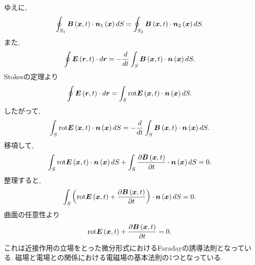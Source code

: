 \documentclass[10pt,a4paper]{jsarticle}
\begin{document}
ゆえに, 
\begin{align*}
    \oint_{S_1} \bm{B} \left( \bm{x}, t \right) \cdot \bm{n}_1 \left( \bm{x} \right) dS = \oint_{S_2} \bm{B} \left( \bm{x}, t \right) \cdot \bm{n}_2 \left( \bm{x} \right) dS. 
\end{align*}
また, 
\begin{align*}
    \oint \bm{E} \left( \bm{r}, t \right) \cdot d \bm{r} = - \frac{d}{dt} \int_S \bm{B} \left( \bm{x}, t \right) \cdot \bm{n} \left( \bm{x} \right) dS.
\end{align*}
Stokesの定理より
\begin{align*}
    \oint \bm{E} \left( \bm{r}, t \right) \cdot d \bm{r} = \int_S \mathrm{rot} \bm{E} \left( \bm{x}, t \right) \cdot \bm{n} \left( \bm{x} \right) dS.
\end{align*}
したがって, 
\begin{align*}
    \int_S \mathrm{rot} \bm{E} \left( \bm{x}, t \right) \cdot \bm{n} \left( \bm{x} \right) dS =  - \frac{d}{dt} \int_S \bm{B} \left( \bm{x}, t \right) \cdot \bm{n} \left( \bm{x} \right) dS. 
\end{align*}
移項して, 
\begin{align*}
    \int_S \mathrm{rot} \bm{E} \left( \bm{x}, t \right) \cdot \bm{n} \left( \bm{x} \right) dS + \int_S \frac{\partial \bm{B} \left( \bm{x}, t \right) }{\partial t} \cdot \bm{n} \left( \bm{x} \right) dS = 0. 
\end{align*}
整理すると, 
\begin{align*}
    \int_S \left( \mathrm{rot} \bm{E} \left( \bm{x}, t \right) + \frac{\partial \bm{B} \left( \bm{x}, t \right) }{\partial t} \right) \cdot \bm{n} \left( \bm{x} \right) dS = 0. 
\end{align*}
曲面の任意性より
\begin{align*}
    \mathrm{rot} \bm{E} \left( \bm{x}, t \right) + \frac{\partial \bm{B} \left( \bm{x}, t \right) }{\partial t} = 0. 
\end{align*}
これは近接作用の立場をとった微分形式におけるFaradayの誘導法則となっている. 磁場と電場との関係における電磁場の基本法則の1つとなっている. 
\end{document}

